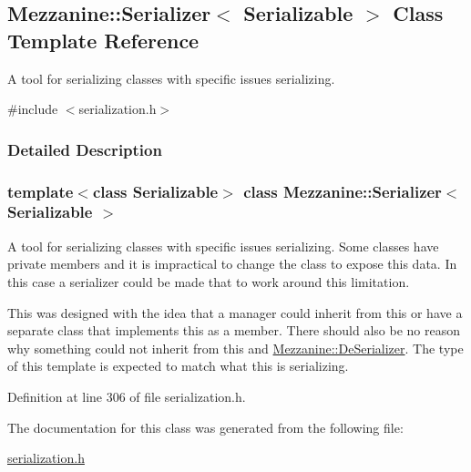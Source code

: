 \hypertarget{classMezzanine_1_1Serializer}{
\subsection{Mezzanine::Serializer$<$ Serializable $>$ Class Template Reference}
\label{classMezzanine_1_1Serializer}
}


A tool for serializing classes with specific issues serializing.  




{\ttfamily \#include $<$serialization.h$>$}



\subsubsection{Detailed Description}
\subsubsection*{template$<$class Serializable$>$ class Mezzanine::Serializer$<$ Serializable $>$}

A tool for serializing classes with specific issues serializing. Some classes have private members and it is impractical to change the class to expose this data. In this case a serializer could be made that to work around this limitation. \par
 \par
 This was designed with the idea that a manager could inherit from this or have a separate class that implements this as a member. There should also be no reason why something could not inherit from this and \hyperlink{classMezzanine_1_1DeSerializer}{Mezzanine::DeSerializer}. The type of this template is expected to match what this is serializing. 

Definition at line 306 of file serialization.h.



The documentation for this class was generated from the following file:\begin{DoxyCompactItemize}
\item 
\hyperlink{serialization_8h}{serialization.h}\end{DoxyCompactItemize}
